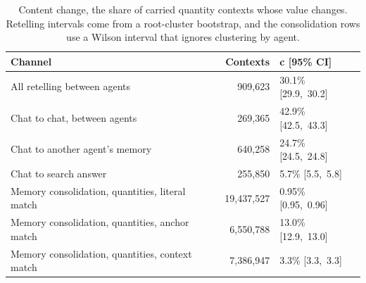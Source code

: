 \documentclass{arxivtmpl}
\begin{document}
\begin{table}[htbp]
\centering
\small
\caption{Content change, the share of carried quantity contexts whose value changes. Retelling intervals come from a root-cluster bootstrap, and the consolidation rows use a Wilson interval that ignores clustering by agent.}
\begin{tabularx}{\linewidth}{Lrl}
\toprule
Channel & Contexts & c [95\% CI] \\
\midrule
All retelling between agents & 909,623 & 30.1\% [29.9,~30.2] \\
Chat to chat, between agents & 269,365 & 42.9\% [42.5,~43.3] \\
Chat to another agent's memory & 640,258 & 24.7\% [24.5,~24.8] \\
Chat to search answer & 255,850 & 5.7\% [5.5,~5.8] \\
Memory consolidation, quantities, literal match & 19,437,527 & 0.95\% [0.95,~0.96] \\
Memory consolidation, quantities, anchor match & 6,550,788 & 13.0\% [12.9,~13.0] \\
Memory consolidation, quantities, context match & 7,386,947 & 3.3\% [3.3,~3.3] \\
\bottomrule
\end{tabularx}
\end{table}

\begin{table}[htbp]
\centering
\small
\caption{Step cost by depth and continuation of an agent's previous session. Slope intervals resample 49 goals, continuation intervals resample agents, and the switch rows use the same-goal baseline.}
\end{table}
\end{document}
